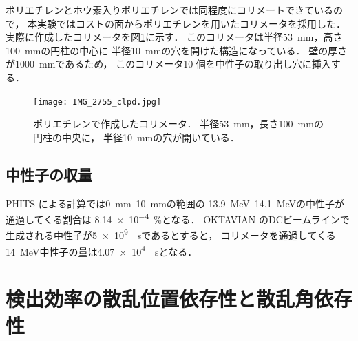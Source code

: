 \documentclass[../master]{subfiles}
\begin{document}
ポリエチレンとホウ素入りポリエチレンでは同程度にコリメートできているので，
本実験ではコストの面からポリエチレンを用いたコリメータを採用した．
実際に作成したコリメータを図\ref{pic::collimator}に示す．
このコリメータは半径\SI{53}{\milli\metre}，高さ\SI{100}{\milli\metre}の円柱の中心に
半径\SI{10}{\milli\metre}の穴を開けた構造になっている．
壁の厚さが\SI{1000}{\milli\metre}であるため，
このコリメータ10 個を中性子の取り出し穴に挿入する．
\begin{figure}
  \centering
  \texttt{[image: IMG\_2755\_clpd.jpg]}
  \caption[ポリエチレンで作成したコリメータ．]
          {ポリエチレンで作成したコリメータ．
            半径\SI{53}{\milli\metre}，長さ\SI{100}{\milli\metre}の円柱の中央に，
          半径\SI{10}{\milli\metre}の穴が開いている．}
  \label{pic::collimator}
\end{figure}

\subsection{中性子の収量}
PHITS による計算では\SIrange{0}{10}{\milli\metre}の範囲の
\SIrange{13.9}{14.1}{\mega\electronvolt}の中性子が通過してくる割合は
\SI{8.14e-4}{\percent}となる．
OKTAVIAN のDCビームラインで生成される中性子が\SI{5e9}{\per\second}であるとすると，
コリメータを通過してくる\SI{14}{\mega\electronvolt}中性子の量は\SI{4.07e4}{\per\second}となる．

\section{検出効率の散乱位置依存性と散乱角依存性}
\end{document}
